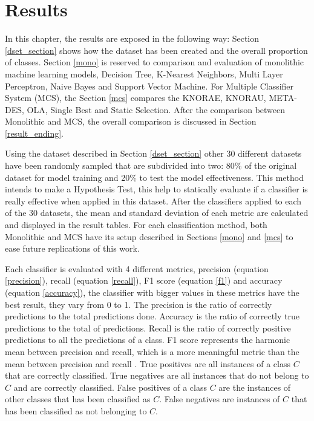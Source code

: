 \chapter{Results}\label{chapter:results}

In this chapter, the results are exposed in the following way: Section \ref{dset_section} shows how the dataset has been created and the overall proportion of classes. Section \ref{mono} is reserved to comparison and evaluation of monolithic machine learning models, Decision Tree, K-Nearest Neighbors, Multi Layer Perceptron, Naive Bayes and Support Vector Machine. For Multiple Classifier System (MCS), the Section \ref{mcs} compares the KNORAE, KNORAU, META-DES, OLA, Single Best and Static Selection. After the comparison between Monolithic and MCS, the overall comparison is discussed in Section \ref{result_ending}.

Using the dataset described in Section \ref{dset_section} other 30 different datasets have been randomly sampled that are subdivided into two: 80\% of the original dataset for model training and 20\% to test the model effectiveness. This method intends to make a Hypothesis Test, this help to statically evaluate if a classifier is really effective when applied in this dataset. After the classifiers applied to each of the 30 datasets, the mean and standard deviation of each metric are calculated and displayed in the result tables. For each classification method, both Monolithic and MCS have its setup described in Sections \ref{mono} and \ref{mcs} to ease future replications of this work. 

Each classifier is evaluated with 4 different metrics, precision (equation \ref{precision}), recall (equation \ref{recall}), F1 score (equation \ref{f1}) and accuracy (equation \ref{accuracy}), the classifier with bigger values in these metrics have the best result, they vary from 0 to 1. The precision is the ratio of correctly predictions to the total predictions done. Accuracy is the ratio of correctly true predictions to the total of predictions. Recall is the ratio of correctly positive predictions to all the predictions of a class. F1 score represents the harmonic mean between precision and recall, which is a more meaningful metric than the mean between precision and recall \cite{sasaki2007truth}. True positives are all instances of a class $C$ that are correctly classified. True negatives are all instances that do not belong to $C$ and are correctly classified. False positives of a class $C$ are the instances of other classes that has been classified as $C$. False negatives are instances of $C$ that has been classified as not belonging to $C$.

